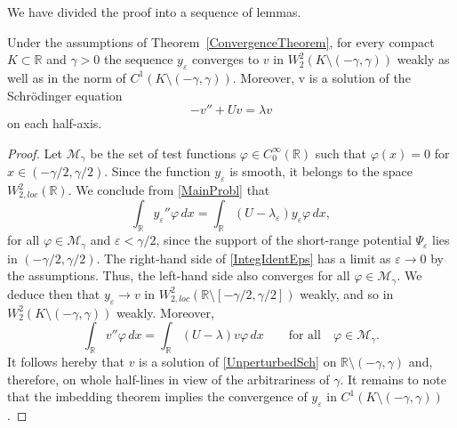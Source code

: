 \documentclass[11pt,english]{amsart}%
\begin{document}
We have divided the proof into a sequence of lemmas.

\begin{g_lemma}\label{LemConvergenceC1}
Under the assumptions of Theorem~\ref{ConvergenceTheorem}, for every compact $K\subset \mathbb{R}$ and $\gamma>0$ the sequence $y_\varepsilon$ converges to $v$ in $W_2^2(K\setminus(-\gamma,\gamma))$ weakly as well as in the norm of $C^1(K\setminus(-\gamma,\gamma))$.
Moreover, v is a solution of the Schr\"{o}dinger
equation
\begin{equation}\label{UnperturbedSch}
-v''+Uv=\lambda v
\end{equation}
on each half-axis.
\end{g_lemma}
\begin{proof}
Let $\mathcal{M}_\gamma$ be the set of test functions  $\varphi\in C_0^\infty(\mathbb{R})$ such that $\varphi(x)=0$ for $x\in (-\gamma/2,\gamma/2)$.
Since the function $y_\varepsilon$ is smooth, it belongs to the space $W_{2,loc}^2(\mathbb{R})$.
We conclude from \eqref{MainProbl} that
\begin{equation}\label{IntegIdentEps}
    \int_\mathbb{R} y_\varepsilon''\varphi\,dx=\int_\mathbb{R} (U-\lambda_\varepsilon)y_\varepsilon\varphi\,dx,
\end{equation}
for all  $\varphi\in \mathcal{M}_\gamma$ and $\varepsilon<\gamma/2$, since the support of the short-range potential $\Psi_\varepsilon$ lies in $(-\gamma/2,\gamma/2)$.
The right-hand side of \eqref{IntegIdentEps} has a limit as $\varepsilon\to 0$ by the assumptions.
Thus, the left-hand side also converges for all  $\varphi\in \mathcal{M}_\gamma$.
We deduce then that $y_\varepsilon \to v$ in $W_{2, loc}^2(\mathbb{R}\setminus[-\gamma/2,\gamma/2])$ weakly, and so
in $W_2^2(K\setminus(-\gamma,\gamma))$ weakly.
Moreover,
\begin{equation*}\label{IntegIdent}
    \int_\mathbb{R} v''\varphi\,dx=\int_\mathbb{R} (U-\lambda)v\varphi\,dx \qquad\text{for all}\quad \varphi\in \mathcal{M}_\gamma.
\end{equation*}
It follows hereby that $v$ is a solution of \eqref{UnperturbedSch} on $\mathbb{R}\setminus(-\gamma,\gamma)$ and, therefore,
on whole half-lines in view of the arbitrariness of $\gamma$.
It remains to note that the imbedding theorem implies the convergence of $y_\varepsilon$ in $C^1(K\setminus(-\gamma,\gamma))$.
\end{proof}
\end{document}
